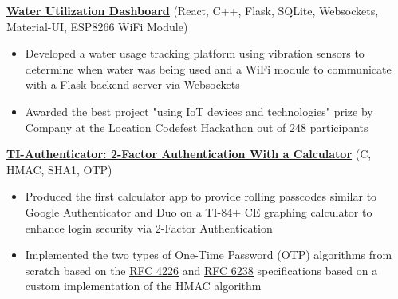 \documentclass[letterpaper,11pt]{article}
\begin{document}
\textbf{\href{https://youtu.be/dQw4w9WgXcQ}{\underline{Water Utilization Dashboard}}} \hfill (React, C++, Flask, SQLite, Websockets, Material-UI, ESP8266 WiFi Module)
\begin{itemize}
    \item Developed a water usage tracking platform using vibration sensors to determine when water was being used and a WiFi module to communicate with a Flask backend server via Websockets
    \item Awarded the best project "using IoT devices and technologies" prize by Company at the Location Codefest Hackathon out of 248 participants
\end{itemize}

\textbf{\href{https://youtu.be/dQw4w9WgXcQ}{\underline{TI-Authenticator: 2-Factor Authentication With a Calculator}}} \hfill (C, HMAC, SHA1, OTP)
\begin{itemize}
    \item Produced the first calculator app to provide rolling passcodes similar to Google Authenticator and Duo on a TI-84+ CE graphing calculator to enhance login security via 2-Factor Authentication
    \item Implemented the two types of One-Time Password (OTP) algorithms from scratch based on the \href{https://youtu.be/dQw4w9WgXcQ}{\underline{RFC 4226}} and \href{https://youtu.be/dQw4w9WgXcQ}{\underline{RFC 6238}} specifications based on a custom implementation of the HMAC algorithm
\end{itemize}
\end{document}
